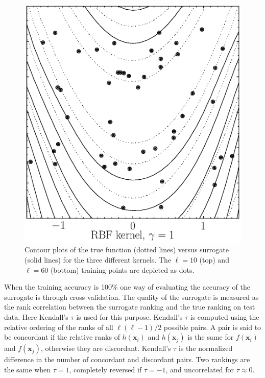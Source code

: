 \documentclass[10pt]{llncs}
\renewcommand{\vec}[1]{{\mbox{\boldmath$#1$}}}
\renewcommand{\vec}[1]{{\mathbf #1}}
\begin{document}
\begin{figure}[t!]
\includegraphics[height=0.33\columnwidth]{figs/rbf1global.eps}
\caption{Contour plots of the true function (dotted lines)
  versus surrogate (solid lines) for the three different
  kernels. The $\ell=10$ (top) and $\ell=60$ (bottom) training
  points are depicted as dots.}
\label{fig:Rosenbrock}
\end{figure}


When the training accuracy is 100\% one way of evaluating the
accuracy of the surrogate is through cross validation. The
quality of the surrogate is measured as the rank correlation
between the surrogate ranking and the true ranking on test data.
Here Kendall's $\tau$ is used for this purpose.  Kendall's
$\tau$ is computed using the relative ordering of the ranks of all
$\ell(\ell-1)/2$ possible pairs.  A pair is said to be
concordant if the relative ranks of $h(\vec{x}_i)$ and
$h(\vec{x}_j)$ is the same for $f(\vec{x}_i)$ and
$f(\vec{x}_j)$, otherwise they are discordant.
 Kendall's $\tau$ is
the normalized difference in the number of concordant and
discordant pairs.
Two rankings are the same when $\tau=1$, completely reversed if
$\tau = -1$, and uncorrelated for $\tau \approx 0$.
\end{document}
